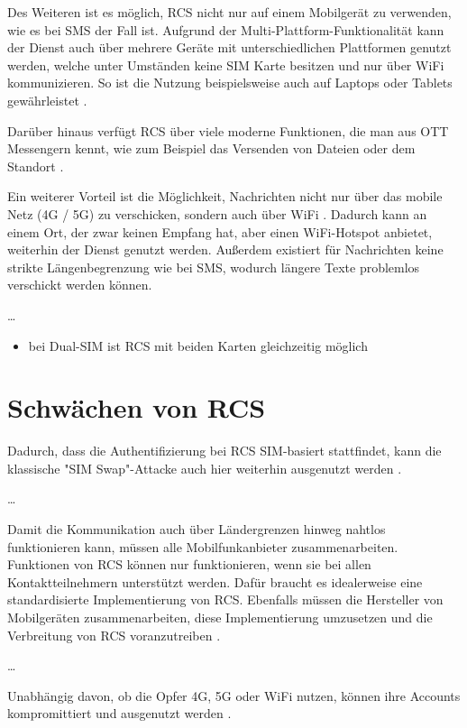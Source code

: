 \documentclass[conference]{IEEEtran}
\begin{document}
Des Weiteren ist es möglich, RCS nicht nur auf einem Mobilgerät zu verwenden, wie es bei SMS der Fall ist.
Aufgrund der Multi-Plattform-Funktionalität kann der Dienst auch über mehrere Geräte mit unterschiedlichen Plattformen genutzt werden, welche unter Umständen keine SIM Karte besitzen und nur über WiFi kommunizieren.
So ist die Nutzung beispielsweise auch auf Laptops oder Tablets gewährleistet \cite{rcsmno,uniprof}.

Darüber hinaus verfügt RCS über viele moderne Funktionen, die man aus OTT Messengern kennt, wie zum Beispiel das Versenden von Dateien oder dem Standort \cite{wafaq,uniprof}.

Ein weiterer Vorteil ist die Möglichkeit, Nachrichten nicht nur über das mobile Netz (4G / 5G) zu verschicken, sondern auch über WiFi \cite{5gmsg}.
Dadurch kann an einem Ort, der zwar keinen Empfang hat, aber einen WiFi-Hotspot anbietet, weiterhin der Dienst genutzt werden.
Außerdem existiert für Nachrichten keine strikte Längenbegrenzung wie bei SMS, wodurch längere Texte problemlos verschickt werden können.

\dots

\begin{itemize}
    \item bei Dual-SIM ist RCS mit beiden Karten gleichzeitig möglich
\end{itemize}
\cite{uniprof}


\section{Schwächen von RCS}

Dadurch, dass die Authentifizierung bei RCS SIM-basiert stattfindet, kann die klassische "SIM Swap"-Attacke auch hier weiterhin ausgenutzt werden \cite{sendoutsms}.

\dots

Damit die Kommunikation auch über Ländergrenzen hinweg nahtlos funktionieren kann, müssen alle Mobilfunkanbieter zusammenarbeiten. Funktionen von RCS können nur funktionieren, wenn sie bei allen Kontaktteilnehmern unterstützt werden. Dafür braucht es idealerweise eine standardisierte Implementierung von RCS. Ebenfalls müssen die Hersteller von Mobilgeräten zusammenarbeiten, diese Implementierung umzusetzen und die Verbreitung von RCS voranzutreiben \cite{rcsmno}.

\dots

Unabhängig davon, ob die Opfer 4G, 5G oder WiFi nutzen, können ihre Accounts kompromittiert und ausgenutzt werden \cite{5gmsg}.
\end{document}
